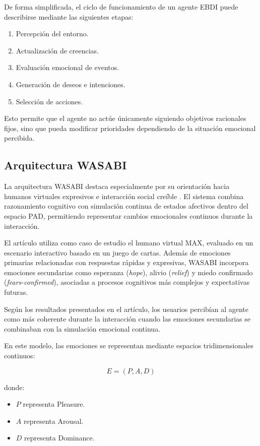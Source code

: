 De forma simplificada, el ciclo de funcionamiento de un agente EBDI puede describirse mediante las siguientes etapas:

\begin{enumerate}
    \item Percepción del entorno.
    \item Actualización de creencias.
    \item Evaluación emocional de eventos.
    \item Generación de deseos e intenciones.
    \item Selección de acciones.
\end{enumerate}

Esto permite que el agente no actúe únicamente siguiendo objetivos racionales fijos, sino que pueda modificar prioridades dependiendo de la situación emocional percibida.

\subsection{Arquitectura WASABI}

La arquitectura WASABI destaca especialmente por su orientación hacia humanos virtuales expresivos e interacción social creíble \cite{becker2009wasabi}. El sistema combina razonamiento cognitivo con simulación continua de estados afectivos dentro del espacio PAD, permitiendo representar cambios emocionales continuos durante la interacción.

El artículo utiliza como caso de estudio el humano virtual MAX, evaluado en un escenario interactivo basado en un juego de cartas. Además de emociones primarias relacionadas con respuestas rápidas y expresivas, WASABI incorpora emociones secundarias como esperanza (\textit{hope}), alivio (\textit{relief}) y miedo confirmado (\textit{fears-confirmed}), asociadas a procesos cognitivos más complejos y expectativas futuras.

Según los resultados presentados en el artículo, los usuarios percibían al agente como más coherente durante la interacción cuando las emociones secundarias se combinaban con la simulación emocional continua.

En este modelo, las emociones se representan mediante espacios tridimensionales continuos:

\begin{equation}
E = (P, A, D)
\end{equation}

donde:

\begin{itemize}
    \item $P$ representa Pleasure.
    \item $A$ representa Arousal.
    \item $D$ representa Dominance.
\end{itemize}

